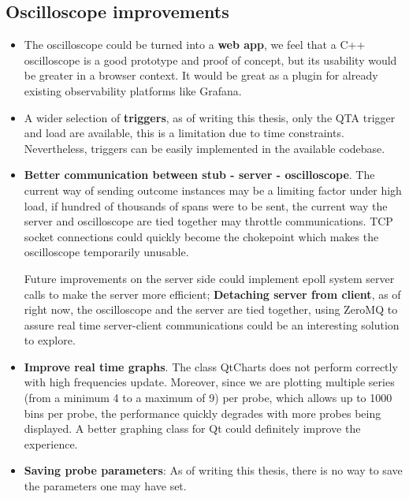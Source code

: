         \subsection{Oscilloscope improvements}
           \begin{itemize}
            
                \item The oscilloscope could be turned into a \textbf{web app}, we feel that a C++ oscilloscope is a good prototype and proof of concept, but its usability would be greater in a browser context. It would be great as a plugin for already existing observability platforms like Grafana.
            
                \item A wider selection of \textbf{triggers}, as of writing this thesis, only the QTA trigger and load are available, this is a limitation due to time constraints. Nevertheless, triggers can be easily implemented in the available codebase.
            
                \item \textbf{Better communication between stub - server - oscilloscope}. The current way of sending outcome instances may be a limiting factor under high load, if hundred of thousands of spans were to be sent, the current way the server and oscilloscope are tied together may throttle communications. TCP socket connections could quickly become the chokepoint which makes the oscilloscope temporarily unusable.

            Future improvements on the server side could implement epoll system server calls to make the server more efficient; \textbf{Detaching server from client}, as of right now, the oscilloscope and the server are tied together, using ZeroMQ to assure real time server-client communications could be an interesting solution to explore.

                \item \textbf{Improve real time graphs}. The class QtCharts does not perform correctly with high frequencies update. Moreover, since we are plotting multiple series (from a minimum 4 to a maximum of 9) per probe, which allows up to 1000 bins per probe, the performance quickly degrades with more probes being displayed. A better graphing class for Qt could definitely improve the experience.

                \item \textbf{Saving probe parameters}: As of writing this thesis, there is no way to save the parameters one may have set. 
           

\end{itemize}
